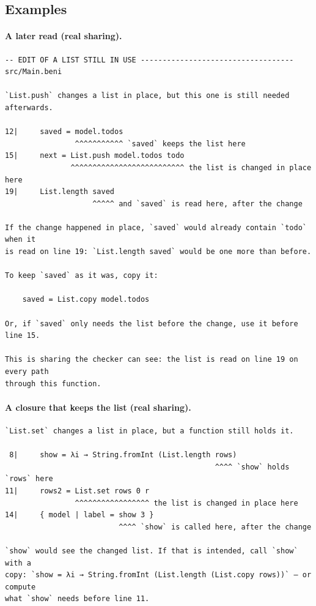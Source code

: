 \subsection{Examples}
\label{sec:errors-examples}

\paragraph{A later read (real sharing).}
\begin{Verbatim}
-- EDIT OF A LIST STILL IN USE ----------------------------------- src/Main.beni

`List.push` changes a list in place, but this one is still needed afterwards.

12|     saved = model.todos
                ^^^^^^^^^^^ `saved` keeps the list here
15|     next = List.push model.todos todo
               ^^^^^^^^^^^^^^^^^^^^^^^^^^ the list is changed in place here
19|     List.length saved
                    ^^^^^ and `saved` is read here, after the change

If the change happened in place, `saved` would already contain `todo` when it
is read on line 19: `List.length saved` would be one more than before.

To keep `saved` as it was, copy it:

    saved = List.copy model.todos

Or, if `saved` only needs the list before the change, use it before line 15.

This is sharing the checker can see: the list is read on line 19 on every path
through this function.
\end{Verbatim}

\paragraph{A closure that keeps the list (real sharing).}
\begin{Verbatim}
`List.set` changes a list in place, but a function still holds it.

 8|     show = λi → String.fromInt (List.length rows)
                                                ^^^^ `show` holds `rows` here
11|     rows2 = List.set rows 0 r
                ^^^^^^^^^^^^^^^^^ the list is changed in place here
14|     { model | label = show 3 }
                          ^^^^ `show` is called here, after the change

`show` would see the changed list. If that is intended, call `show` with a
copy: `show = λi → String.fromInt (List.length (List.copy rows))` — or compute
what `show` needs before line 11.
\end{Verbatim}


